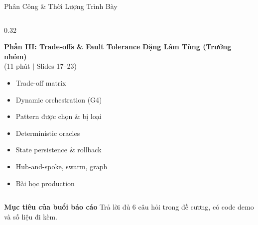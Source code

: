 \documentclass[aspectratio=1610,10pt,xcolor={table}]{beamer}
\begin{document}
\begin{frame}{Phân Công \& Thời Lượng Trình Bày}
\begin{columns}[t]
    \begin{column}{0.32\textwidth}
      \begin{block}{\textbf{Phần III: Trade-offs \& Fault Tolerance}}
        {\small\textbf{Đặng Lâm Tùng (Trưởng nhóm)}}\\
        {\scriptsize (11 phút $\vert$ Slides 17--23)}\\[0.08cm]
        \begin{itemize}\scriptsize
          \item Trade-off matrix
          \item Dynamic orchestration (G4)
          \item Pattern được chọn \& bị loại
          \item Deterministic oracles
          \item State persistence \& rollback
          \item Hub-and-spoke, swarm, graph
          \item Bài học production
        \end{itemize}
      \end{block}
    \end{column}
  \end{columns}

  \vspace{0.05cm}
  \begin{alertblock}{\footnotesize \textbf{Mục tiêu của buổi báo cáo}}
    \scriptsize Trả lời đủ 6 câu hỏi trong đề cương, có code demo và số liệu đi kèm.
  \end{alertblock}
\end{frame}
\end{document}
